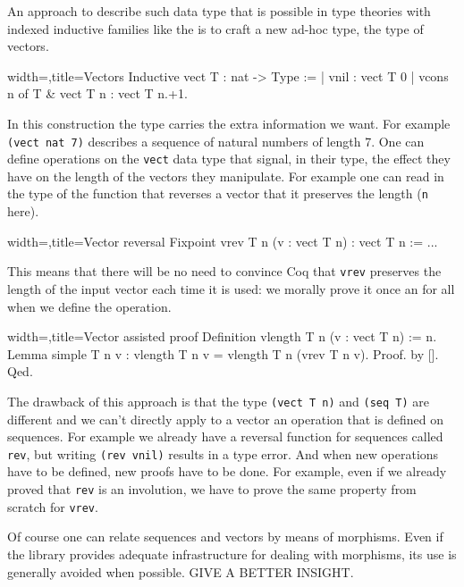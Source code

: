 An approach to describe such data type that is possible in type
theories with indexed inductive families like the \mcbCIC{} is to
craft a new ad-hoc type, the type of vectors.

\begin{coq}{width=\textwidth,title=Vectors}
Inductive vect T : nat -> Type :=
| vnil : vect T 0
| vcons n of T & vect T n : vect T n.+1.
\end{coq}

In this construction the type carries the extra information we want.
For example \lstinline/(vect nat 7)/ describes a sequence of natural
numbers of length 7.
One can define operations on the \lstinline/vect/ data type that
signal, in their type, the effect they have on the length of the
vectors they manipulate.  For example one can read in the type of the
function that reverses a vector that it preserves the length
(\lstinline/n/ here).

\begin{coq}{width=\textwidth,title=Vector reversal}
Fixpoint vrev T n (v : vect T n) : vect T n := ...
\end{coq}

This means that there will be no need to convince Coq that
\lstinline/vrev/ preserves the length of the input vector
each time it is used: we morally prove it once an for all
when we define the operation.

\begin{coq}{width=\textwidth,title=Vector assisted proof}
Definition vlength T n (v : vect T n) := n.
Lemma simple T n v : vlength T n v = vlength T n (vrev T n v).
Proof. by []. Qed.
\end{coq}

The drawback of this approach is that the type \lstinline/(vect T n)/
and \lstinline/(seq T)/ are different and we can't directly apply to a
vector an operation that is defined on sequences.  For example we
already have a reversal function for sequences called \lstinline/rev/,
but writing \lstinline/(rev vnil)/ results in a type error.  And when
new operations have to be defined, new proofs have to be done. For
example, even if we already proved that \lstinline/rev/ is an
involution, we have to prove the same property from scratch for
\lstinline/vrev/.

Of course one can relate sequences and vectors by means of
morphisms.  Even if the \mcbMC{} library provides adequate
infrastructure for dealing with morphisms, its use is generally
avoided when possible.  GIVE A BETTER INSIGHT.

